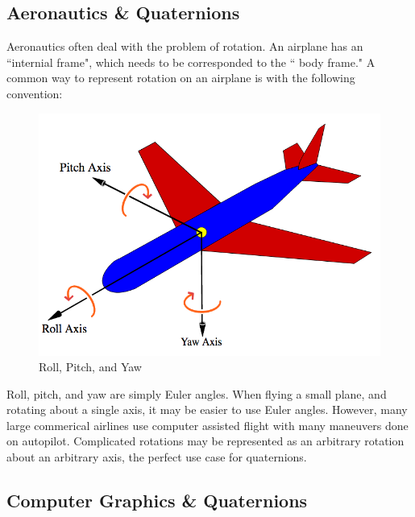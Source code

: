 \subsection{Aeronautics \& Quaternions}
Aeronautics often deal with the problem of rotation.
An airplane has an ``internial frame", which needs to be corresponded to the `` body frame."
A common way to represent rotation on an airplane is with the following convention:
\begin{figure}[H]
\centering
\includegraphics[width = .75\textwidth]{Figures/plane.png}
\caption{Roll, Pitch, and Yaw}
\label{fig:cycle}
\end{figure}
Roll, pitch, and yaw are simply Euler angles.
When flying a small plane, and rotating about a single axis, it may be easier to use Euler angles.
However, many large commerical airlines use computer assisted flight with many maneuvers done on autopilot.
Complicated rotations may be represented as an arbitrary rotation about an arbitrary axis, the perfect use case for quaternions.


\subsection{Computer Graphics \& Quaternions}
